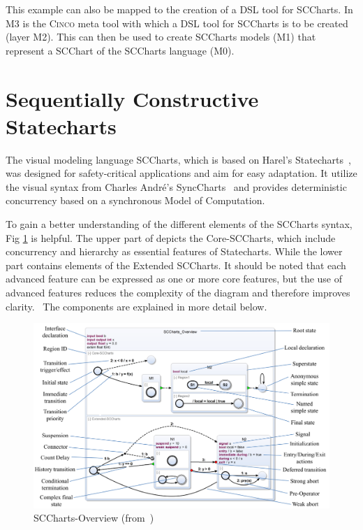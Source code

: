 This example can also be mapped to the creation of a DSL tool for SCCharts. In M3 is the \textsc{Cinco} meta tool with which a DSL tool for SCCharts is to be created (layer M2). This can then be used to create SCCharts models (M1) that represent a SCChart of the SCCharts language (M0).

\section{Sequentially Constructive Statecharts} \label{Sequentially_Constructive_Statecharts}
The visual modeling language SCCharts, which is based on Harel's Statecharts~\cite{Harel.1987}, was designed for safety-critical applications and aim for easy adaptation. It utilize the visual syntax from Charles André's SyncCharts~\cite{andre.} and provides deterministic concurrency based on a synchronous Model of Computation. 

To gain a better understanding of the different elements of the SCCharts syntax, Fig \ref{fig:SCChart-Overview} is helpful. The upper part of depicts the Core-SCCharts, which include concurrency and hierarchy as essential features of Statecharts. While the lower part contains elements of the Extended SCCharts. It should be noted that each advanced feature can be expressed as one or more core features, but the use of advanced features reduces the complexity of the diagram and therefore improves clarity.~\cite{Hanxleden.2014} The components are explained in more detail below.

\begin{figure}[h!]
\centering
\includegraphics[width=1.0\textwidth]{bilder/SCChart-Overview.png}
\caption{SCCharts-Overview (from~\cite{Hanxleden.2014})}
\label{fig:SCChart-Overview}
\end{figure} 

